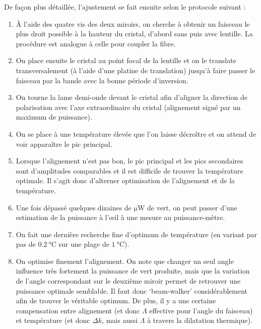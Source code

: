 \documentclass[11pt,a4paper] { article}
\begin{document}
De façon plus détaillée, l'ajustement se fait ensuite selon le protocole suivant :
\begin{enumerate}
	\item À l'aide des quatre vis des deux miroirs, on cherche à obtenir un faisceau le plus droit possible à la hauteur du cristal, d'abord sans puis avec lentille. La procédure est analogue à celle pour coupler la fibre.
	\item On place ensuite le cristal au point focal de la lentille et on le translate transversalement (à l'aide d'une platine de translation) jusqu'à faire passer le faisceau par la bande avec la bonne période d'inversion.
	\item On tourne la lame demi-onde devant le cristal afin d'aligner la direction de polarisation avec l'axe extraordinaire du cristal (alignement signé par un maximum de puissance).
	\item On se place à une température élevée que l'on laisse décroître et on attend de voir apparaître le pic principal.
	\item Lorsque l'alignement n'est pas bon, le pic principal et les pics secondaires sont d'amplitudes comparables et il est difficile de trouver la température optimale. Il s'agit donc d'alterner optimisation de l'alignement et de la température.
	\item Une fois dépassé quelques dizaines de $\unit{\micro\watt}$ de vert, on peut passer d'une estimation de la puissance à l'\oe il à une mesure au puissance-mètre.
	\item On fait une dernière recherche fine d'optimum de température (en variant par pas de $\SI{0.2}{\celsius}$ sur une plage de $\SI{1}{\celsius}$).
	\item On optimise finement l'alignement. On note que changer un seul angle influence très fortement la puissance de vert produite, mais que la variation de l'angle correspondant sur le deuxième miroir permet de retrouver une puissance optimale semblable. Il faut donc `beam-walker' considérablement afin de trouver le véritable optimum. De plus, il y a une certaine compensation entre alignement (et donc $\Lambda$ effective pour l'angle du faisceau) et température (et donc $\Delta k$, mais aussi $\Lambda$ à travers la dilatation thermique).
\end{enumerate}





\end{document}
